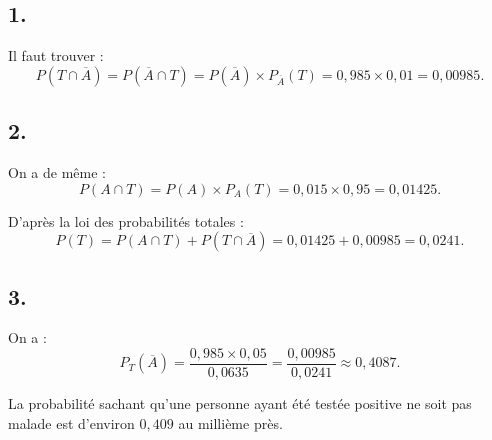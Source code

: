 \subsection*{1.}

\begin{center}
\end{center}

Il faut trouver :
\[
P(T \cap \overline{A}) = P(\overline{A} \cap T) = P(\overline{A}) \times P_{\overline{A}}(T) = 0{,}985 \times 0{,}01 = 0{,}00985.
\]

\subsection*{2.}

On a de même :
\[
P(A \cap T) = P(A) \times P_A(T) = 0{,}015 \times 0{,}95 = 0{,}01425.
\]

D'après la loi des probabilités totales :
\[
P(T) = P(A \cap T) + P(T \cap \overline{A}) = 0{,}01425 + 0{,}00985 = 0{,}0241.
\]

\subsection*{3.}

On a :
\[
P_T(\overline{A}) = \dfrac{0{,}985 \times 0{,}05}{0{,}0635} = \dfrac{0{,}00985}{0{,}0241} \approx 0{,}4087.
\]

La probabilité sachant qu'une personne ayant été testée positive ne soit pas malade est d'environ \(0{,}409\) au millième près.
